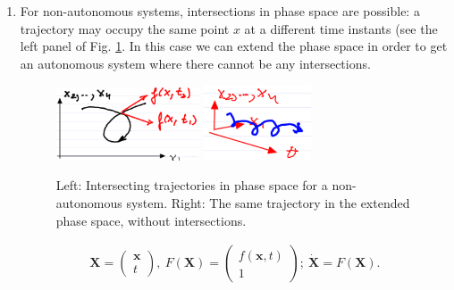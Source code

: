 \begin{enumerate}
	\item For non-autonomous systems, intersections in phase space are possible: a trajectory may occupy the same point $x$ at a different time instants (see the left panel of Fig. \ref{fig:automization}. In this case we can extend the phase space in order to get an autonomous system where there cannot be any intersections.
		\begin{figure}[h!]
			\centering
			\includegraphics[width=0.4\textwidth]{figures/ch1/4intersecting_trajectories.png}
			\hspace{0.05\textwidth}
			\includegraphics[width=0.3\textwidth]{figures/ch1/5extended_space.png}
			\caption{Left: Intersecting trajectories in phase space for a non-autonomous system. Right: The same trajectory in the extended phase space, without intersections.}
			\label{fig:automization}
		\end{figure}
		\begin{align}
			 \textbf{X} = 
			\begin{pmatrix}
				 \textbf{x} \\ t
			\end{pmatrix},\
			F( \textbf{X}) = 
			\begin{pmatrix}
				f( \textbf{x},t) \\ 1
			\end{pmatrix};\
			\dot{ \textbf{X}} = F( \textbf{X}).
		\end{align}
\end{enumerate}

